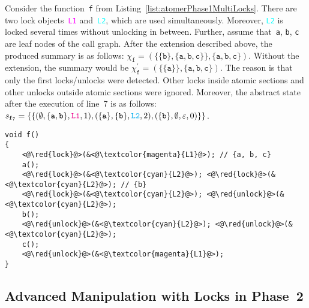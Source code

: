 \begin{example}
    Consider the function~\texttt{f} from Listing~\ref{list:atomerPhase1MultiLocks}. There are two lock objects~\textcolor{magenta}{\texttt{L1}} and~\textcolor{cyan}{\texttt{L2}}, which are used simultaneously. Moreover, \textcolor{cyan}{\texttt{L2}} is locked several times without unlocking in between. Further, assume that~\texttt{a}, \texttt{b}, \texttt{c} are leaf nodes of the call graph. After the extension described above, the produced summary is as follows: $ \chi_\mathtt{f} = (\{\{\mathtt{b}\}, \{\mathtt{a}, \mathtt{b}, \mathtt{c}\}\}, \{\mathtt{a}, \mathtt{b}, \mathtt{c}\}) $. Without the extension, the summary would be $ \chi_\mathtt{f}^\prime = (\{\{\mathtt{a}\}\}, \{\mathtt{a}, \mathtt{b}, \mathtt{c}\}) $. The reason is that only the first locks/unlocks were detected. Other locks inside atomic sections and other unlocks outside atomic sections were ignored. Moreover, the abstract state after the execution of line~7 is as follows: $ s_{\mathtt{f}_7} = \{\{(\emptyset, \{\mathtt{a}, \mathtt{b}\}, \textcolor{magenta}{\mathtt{L1}}, 1), (\{\mathtt{a}\}, \{\mathtt{b}\}, \textcolor{cyan}{\mathtt{L2}}, 2), (\{\mathtt{b}\}, \emptyset, \varepsilon, 0)\}\} $.
\end{example}

\begin{lstlisting}[style=c, label={list:atomerPhase1MultiLocks}, float=hbt, caption={A~code snippet used to illustrate the \emph{advanced manipulation with locks} during the first phase of the analysis}]
void f()
{
    <@\red{lock}@>(&<@\textcolor{magenta}{L1}@>); // {a, b, c}
    a();
    <@\red{lock}@>(&<@\textcolor{cyan}{L2}@>); <@\red{lock}@>(&<@\textcolor{cyan}{L2}@>); // {b}
    <@\red{lock}@>(&<@\textcolor{cyan}{L2}@>); <@\red{unlock}@>(&<@\textcolor{cyan}{L2}@>);
    b();
    <@\red{unlock}@>(&<@\textcolor{cyan}{L2}@>); <@\red{unlock}@>(&<@\textcolor{cyan}{L2}@>);
    c();
    <@\red{unlock}@>(&<@\textcolor{magenta}{L1}@>);
}
\end{lstlisting}

\subsection{Advanced Manipulation with Locks in Phase~2}
\label{sec:proposalMultiLocksPhase2}

